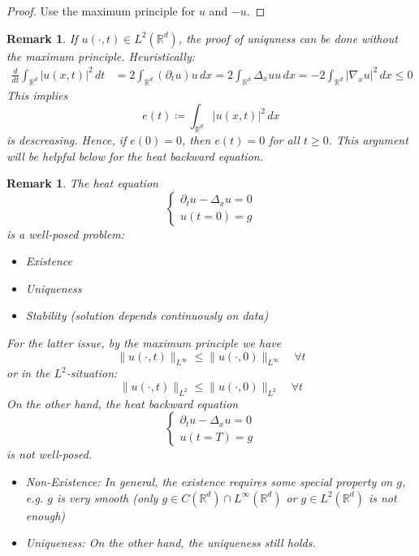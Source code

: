 \documentclass{report}
\theoremstyle{tommy}
\newtheorem{rem}[defn]{Remark}
\begin{document}
  \begin{proof}
	  Use the maximum principle for \(u\) and \(-u\).
  \end{proof}

  \begin{rem}
	If \(u(\cdot, t) \in L^2(\mathbb{R}^d)\), the proof of uniquness can be done without the maximum principle. Heuristically:
	\begin{align*}
		\frac{d}{dt} \int_{\mathbb{R}^d} |u(x,t)|^2 \, dt &= 2 \int_{\mathbb{R}^d} (\partial_t u)u \, dx
		= 2 \int_{\mathbb{R}^d} \Delta_x u u \, dx
		= -2 \int_{\mathbb{R}^d} |\nabla_x u|^2 \, dx \le 0
	\end{align*}
	This implies 
	\[e(t) \coloneqq \int_{\mathbb{R}^d} |u(x,t)|^2 \, dx\]
	is descreasing. Hence, if \(e(0) = 0\), then \(e(t) = 0\) for all \(t \ge 0\). This argument will be helpful below for the heat backward equation.
  \end{rem}

  \begin{rem}
    The heat equation 
    \[\begin{cases}
		\partial_t u - \Delta_x u = 0 \\ u(t=0) = g
	\end{cases}\] is a well-posed problem:
    \begin{itemize}
      \item Existence
      \item Uniqueness
      \item Stability (solution depends continuously on data)
    \end{itemize}    
    For the latter issue, by the maximum principle we have 
    \[\|u(\cdot, t)\|_{L^\infty} \le \|u(\cdot, 0)\|_{L^\infty} \quad \forall t\]
    or in the \(L^2\)-situation:
    \[\|u(\cdot, t)\|_{L^2} \le \|u(\cdot, 0)\|_{L^2} \quad \forall t\]
    On the other hand, the heat backward equation 
    \[\begin{cases}
      \partial_t u - \Delta_x u = 0 \\ u(t = T) = g
    \end{cases}\]
    is \emph{not} well-posed.
    \begin{itemize}
      \item Non-Existence: In general, the existence requires some special property on \(g\), e.g. \(g \) is very smooth (only \(g \in C(\mathbb{R}^d) \cap L^\infty(\mathbb{R}^d)\) or \(g \in L^2(\mathbb{R}^d)\) is not enough)
      \item Uniqueness: On the other hand, the uniqueness still holds.
    \end{itemize}
  \end{rem}
\end{document}
